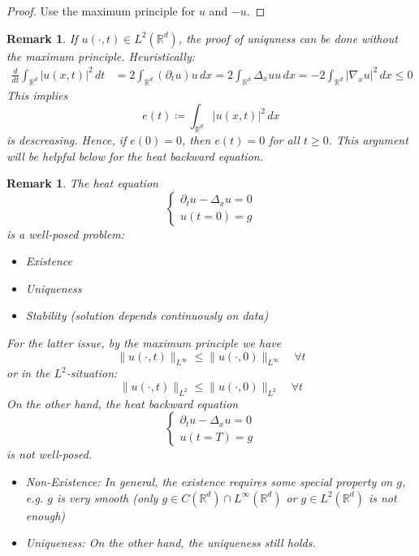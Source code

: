 \documentclass{report}
\theoremstyle{tommy}
\newtheorem{rem}[defn]{Remark}
\begin{document}
  \begin{proof}
	  Use the maximum principle for \(u\) and \(-u\).
  \end{proof}

  \begin{rem}
	If \(u(\cdot, t) \in L^2(\mathbb{R}^d)\), the proof of uniquness can be done without the maximum principle. Heuristically:
	\begin{align*}
		\frac{d}{dt} \int_{\mathbb{R}^d} |u(x,t)|^2 \, dt &= 2 \int_{\mathbb{R}^d} (\partial_t u)u \, dx
		= 2 \int_{\mathbb{R}^d} \Delta_x u u \, dx
		= -2 \int_{\mathbb{R}^d} |\nabla_x u|^2 \, dx \le 0
	\end{align*}
	This implies 
	\[e(t) \coloneqq \int_{\mathbb{R}^d} |u(x,t)|^2 \, dx\]
	is descreasing. Hence, if \(e(0) = 0\), then \(e(t) = 0\) for all \(t \ge 0\). This argument will be helpful below for the heat backward equation.
  \end{rem}

  \begin{rem}
    The heat equation 
    \[\begin{cases}
		\partial_t u - \Delta_x u = 0 \\ u(t=0) = g
	\end{cases}\] is a well-posed problem:
    \begin{itemize}
      \item Existence
      \item Uniqueness
      \item Stability (solution depends continuously on data)
    \end{itemize}    
    For the latter issue, by the maximum principle we have 
    \[\|u(\cdot, t)\|_{L^\infty} \le \|u(\cdot, 0)\|_{L^\infty} \quad \forall t\]
    or in the \(L^2\)-situation:
    \[\|u(\cdot, t)\|_{L^2} \le \|u(\cdot, 0)\|_{L^2} \quad \forall t\]
    On the other hand, the heat backward equation 
    \[\begin{cases}
      \partial_t u - \Delta_x u = 0 \\ u(t = T) = g
    \end{cases}\]
    is \emph{not} well-posed.
    \begin{itemize}
      \item Non-Existence: In general, the existence requires some special property on \(g\), e.g. \(g \) is very smooth (only \(g \in C(\mathbb{R}^d) \cap L^\infty(\mathbb{R}^d)\) or \(g \in L^2(\mathbb{R}^d)\) is not enough)
      \item Uniqueness: On the other hand, the uniqueness still holds.
    \end{itemize}
  \end{rem}
\end{document}
